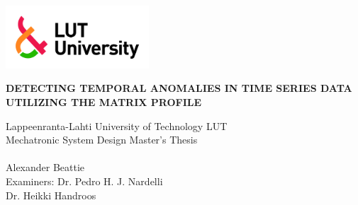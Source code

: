\begin{flushleft}
\thispagestyle{empty}
\includegraphics[width=0.4\textwidth]{Images/lut5.jpg}

\end{flushleft}

\begin{flushleft}
\vfill
\textbf{\uppercase{Detecting Temporal Anomalies in Time Series Data Utilizing the Matrix Profile}}\\
\vfill
\end{flushleft}

\begin{flushleft}

Lappeenranta-Lahti University of Technology LUT \\

Mechatronic System Design Master's Thesis \\

\the\year{} \\

Alexander Beattie \\

Examiners: Dr. Pedro H. J. Nardelli \\
\hspace{2.075cm} Dr. Heikki Handroos

\end{flushleft}

